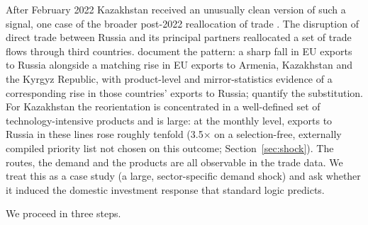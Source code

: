 \documentclass[12pt]{article}
\begin{document}
After February 2022 Kazakhstan received an unusually clean version of such a signal, one case
of the broader post-2022 reallocation of trade
\citep{aiyar2023geoeconomic,alfarochor2023reallocation}. The
disruption of direct trade between Russia and its principal partners reallocated a set of
trade flows through third countries. \citet{chupilkin2026roundabout} document the
pattern: a sharp fall in EU exports to Russia alongside a matching rise in EU exports to
Armenia, Kazakhstan and the Kyrgyz Republic, with product-level and mirror-statistics evidence
of a corresponding rise in those countries' exports to Russia;
\citet{chupilkin2025intermediated} quantify the substitution. 
For Kazakhstan the reorientation is concentrated in a well-defined set of
technology-intensive products and is large: at the monthly level, exports to Russia in these
lines rose roughly tenfold (3.5$\times$ on a selection-free, externally compiled priority list
not chosen on this outcome; Section~\ref{sec:shock}). The routes, the demand and the products are all observable in the
trade data. We treat this as a case study (a large, sector-specific demand
shock) and ask whether it induced the domestic investment response that standard logic predicts.

We proceed in three steps.
\end{document}
